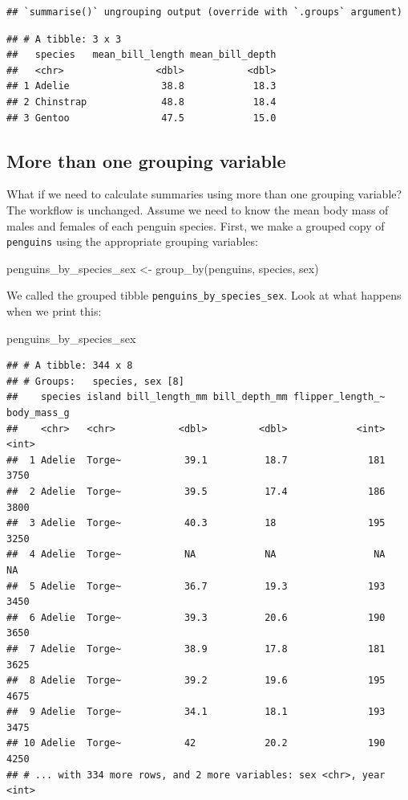 \documentclass[
]{book}
\newenvironment{Shaded}{\begin{snugshade}}{\end{snugshade}}
\newcommand{\FunctionTok}[1]{\textcolor[rgb]{0.00,0.00,0.00}{#1}}
\newcommand{\NormalTok}[1]{#1}
\newcommand{\OtherTok}[1]{\textcolor[rgb]{0.56,0.35,0.01}{#1}}
\begin{document}
\begin{verbatim}
## `summarise()` ungrouping output (override with `.groups` argument)
\end{verbatim}

\begin{verbatim}
## # A tibble: 3 x 3
##   species   mean_bill_length mean_bill_depth
##   <chr>                <dbl>           <dbl>
## 1 Adelie                38.8            18.3
## 2 Chinstrap             48.8            18.4
## 3 Gentoo                47.5            15.0
\end{verbatim}

\hypertarget{more-than-one-grouping-variable}{%
\subsection{More than one grouping variable}\label{more-than-one-grouping-variable}}

What if we need to calculate summaries using more than one grouping variable? The workflow is unchanged. Assume we need to know the mean body mass of males and females of each penguin species. First, we make a grouped copy of \texttt{penguins} using the appropriate grouping variables:

\begin{Shaded}
\begin{Highlighting}[]
\NormalTok{penguins\_by\_species\_sex }\OtherTok{\textless{}{-}} \FunctionTok{group\_by}\NormalTok{(penguins, species, sex)}
\end{Highlighting}
\end{Shaded}

We called the grouped tibble \texttt{penguins\_by\_species\_sex}. Look at what happens when we print this:

\begin{Shaded}
\begin{Highlighting}[]
\NormalTok{penguins\_by\_species\_sex}
\end{Highlighting}
\end{Shaded}

\begin{verbatim}
## # A tibble: 344 x 8
## # Groups:   species, sex [8]
##    species island bill_length_mm bill_depth_mm flipper_length_~ body_mass_g
##    <chr>   <chr>           <dbl>         <dbl>            <int>       <int>
##  1 Adelie  Torge~           39.1          18.7              181        3750
##  2 Adelie  Torge~           39.5          17.4              186        3800
##  3 Adelie  Torge~           40.3          18                195        3250
##  4 Adelie  Torge~           NA            NA                 NA          NA
##  5 Adelie  Torge~           36.7          19.3              193        3450
##  6 Adelie  Torge~           39.3          20.6              190        3650
##  7 Adelie  Torge~           38.9          17.8              181        3625
##  8 Adelie  Torge~           39.2          19.6              195        4675
##  9 Adelie  Torge~           34.1          18.1              193        3475
## 10 Adelie  Torge~           42            20.2              190        4250
## # ... with 334 more rows, and 2 more variables: sex <chr>, year <int>
\end{verbatim}
\end{document}
